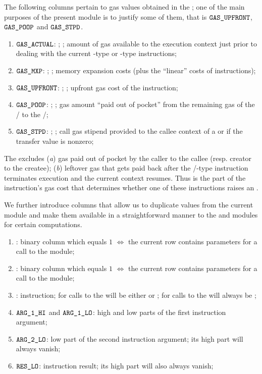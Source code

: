 The following columns pertain to gas values obtained in the \hubMod{};
one of the main purposes of the present module is to justify some of them, that is
$\texttt{GAS}\texttt{\_UPFRONT}$, $\texttt{GAS}\texttt{\_POOP}$ and $\texttt{GAS}\texttt{\_STPD}$.
\begin{enumerate}[resume]
	\item $\texttt{GAS}\texttt{\_ACTUAL}$: \godGiven{};
		\ccc{}; amount of gas available to the execution context just prior to dealing with the current -type or -type instructions;
	\item $\texttt{GAS}\texttt{\_MXP}$: \godGiven{};
		\ccc{}; memory expansion costs (plus the ``linear'' costs of  instructions);
	\item $\texttt{GAS}\texttt{\_UPFRONT}$: \godGiven{};
		\ccc{}; upfront gas cost of the instruction;
	\item $\texttt{GAS}\texttt{\_POOP}$: \godGiven{};
		\ccc{}; gas amount ``paid out of pocket'' from the remaining gas of the
		\callerName{}/\creator{} to the
		\calleeName{}/\createe{};
	\item $\texttt{GAS}\texttt{\_STPD}$: \godGiven{};
		\ccc{}; call gas stipend provided to the callee context of a  or  if the transfer value is nonzero;
\end{enumerate}
\saNote{}
The \gasUpfront{} excludes
(\emph{a}) gas paid out of pocket by the caller to the callee (resp. creator to the createe);
(\emph{b}) leftover gas that gets paid back after the /-type instruction terminates execution and the current context resumes.
Thus \gasUpfront{} is the part of the instruction's gas cost that determines whether one of these instructions raises an \oogxSH{}.

We further introduce columns that allow us to duplicate values from the current module and make them available in a straightforward manner to the \wcpMod{} and \modMod{} modules for certain computations.
\begin{enumerate}[resume]
	\item \wcpLookupFlag{}:
		binary column which equals $1$ $\iff$ the current row contains parameters for a call to the \wcpMod{} module;
	\item \divLookupFlag{}:
		binary column which equals $1$ $\iff$ the current row contains parameters for a call to the \modMod{} module;
	\item \exoInst{}:
		instruction; for calls to the \wcpMod{} will be either  or ; for calls to the \modMod{} will always be ;
	\item $\texttt{ARG}\texttt{\_1}\texttt{\_HI}{}$ and $\texttt{ARG}\texttt{\_1}\texttt{\_LO}{}$:
		high and low parts of the first instruction argument;
	\item $\texttt{ARG}\texttt{\_2}\texttt{\_LO}{}$:
		low part of the second instruction argument; its high part will always vanish;
	\item $\texttt{RES}\texttt{\_LO}{}$:
		instruction result; its high part will also always vanish;
\end{enumerate}
